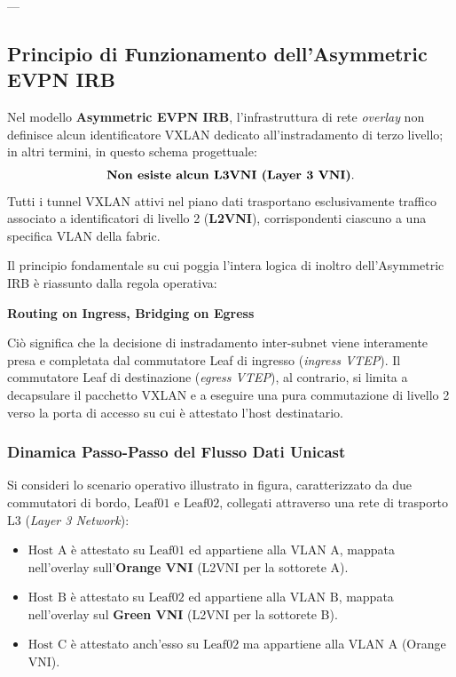 \documentclass[11pt, a4paper]{article}
\begin{document}
---

\subsection{Principio di Funzionamento dell'Asymmetric EVPN IRB}

Nel modello \textbf{Asymmetric EVPN IRB}, l'infrastruttura di rete \emph{overlay} non definisce alcun identificatore VXLAN dedicato all'instradamento di terzo livello; in altri termini, in questo schema progettuale:
\[
\text{\textbf{Non esiste alcun L3VNI (Layer 3 VNI)}}.
\]
Tutti i tunnel VXLAN attivi nel piano dati trasportano esclusivamente traffico associato a identificatori di livello 2 (\textbf{L2VNI}), corrispondenti ciascuno a una specifica VLAN della fabric.

Il principio fondamentale su cui poggia l'intera logica di inoltro dell'Asymmetric IRB è riassunto dalla regola operativa:
\begin{center}
    \textbf{Routing on Ingress, Bridging on Egress}
\end{center}

Ciò significa che la decisione di instradamento inter-subnet viene interamente presa e completata dal commutatore Leaf di ingresso (\emph{ingress VTEP}). Il commutatore Leaf di destinazione (\emph{egress VTEP}), al contrario, si limita a decapsulare il pacchetto VXLAN e a eseguire una pura commutazione di livello 2 verso la porta di accesso su cui è attestato l'host destinatario.


\subsubsection{Dinamica Passo-Passo del Flusso Dati Unicast}
Si consideri lo scenario operativo illustrato in figura, caratterizzato da due commutatori di bordo, $\text{Leaf01}$ e $\text{Leaf02}$, collegati attraverso una rete di trasporto L3 (\emph{Layer 3 Network}):
\begin{itemize}[noitemsep]
    \item $\text{Host A}$ è attestato su $\text{Leaf01}$ ed appartiene alla $\text{VLAN A}$, mappata nell'overlay sull'\textbf{Orange VNI} (L2VNI per la sottorete A).
    \item $\text{Host B}$ è attestato su $\text{Leaf02}$ ed appartiene alla $\text{VLAN B}$, mappata nell'overlay sul \textbf{Green VNI} (L2VNI per la sottorete B).
    \item $\text{Host C}$ è attestato anch'esso su $\text{Leaf02}$ ma appartiene alla $\text{VLAN A}$ (Orange VNI).
\end{itemize}
\end{document}
